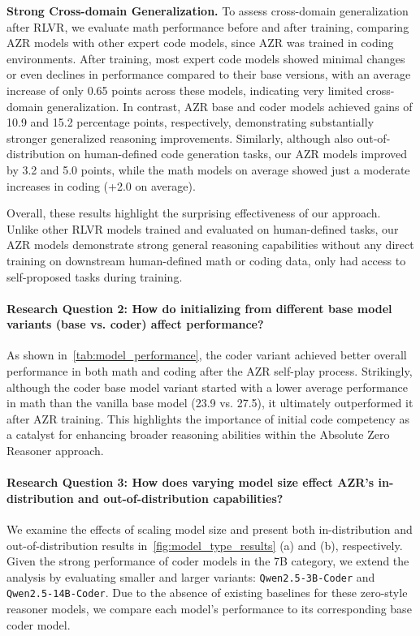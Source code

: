 \documentclass{article}
\begin{document}
\textbf{Strong Cross-domain Generalization.} To assess cross-domain generalization after RLVR, we evaluate math performance before and after training, comparing AZR models with other expert code models, since AZR was trained in coding environments. After training, most expert code models showed minimal changes or even declines in performance compared to their base versions, with an average increase of only 0.65 points across these models, indicating very limited cross-domain generalization. In contrast, AZR base and coder models achieved gains of 10.9 and 15.2 percentage points, respectively, demonstrating substantially stronger generalized reasoning improvements. Similarly, although also out-of-distribution on human-defined code generation tasks, our AZR models improved by 3.2 and 5.0 points, while the math models on average showed just a moderate increases in coding (+2.0 on average).

Overall, these results highlight the surprising effectiveness of our approach. Unlike other RLVR models trained and evaluated on human-defined tasks, our AZR models demonstrate strong general reasoning capabilities without any direct training on downstream human-defined math or coding data, only had access to self-proposed tasks during training.

\paragraph{Research Question 2: How do initializing from different base model variants (base vs. coder) affect performance?}
As shown in~\cref{tab:model_performance}, the coder variant achieved better overall performance in both math and coding after the AZR self-play process. Strikingly, although the coder base model variant started with a lower average performance in math than the vanilla base model (23.9 vs. 27.5), it ultimately outperformed it after AZR training. This highlights the importance of initial code competency as a catalyst for enhancing broader reasoning abilities within the Absolute Zero Reasoner approach.

\paragraph{Research Question 3: How does varying model size effect AZR's in-distribution and out-of-distribution capabilities?}
We examine the effects of scaling model size and present both in-distribution and out-of-distribution results in~\cref{fig:model_type_results} (a) and (b), respectively. Given the strong performance of coder models in the 7B category, we extend the analysis by evaluating smaller and larger variants: \texttt{Qwen2.5-3B-Coder} and \texttt{Qwen2.5-14B-Coder}. Due to the absence of existing baselines for these zero-style reasoner models, we compare each model's performance to its corresponding base coder model.
\end{document}
